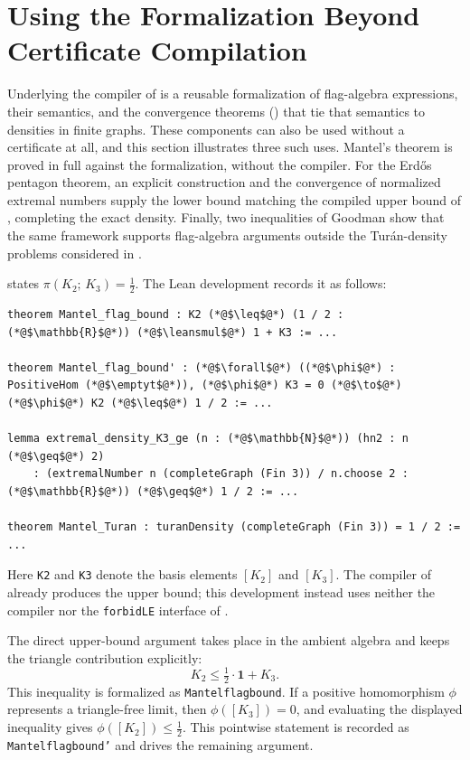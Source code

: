 \documentclass[acmsmall,screen=true,acmthm=false]{acmart}
\newcommand{\tdensity}[2]{\pi(#1;\,#2)}
\newcommand{\boldparagraph}[1]{\noindentparagraph{\textnormal{\textbf{#1}}}}
\DeclareRobustCommand{\lean}[1]{{\def\_{\textunderscore\allowbreak}\texttt{#1}}}
\newcommand{\emptyt}{\emptyset_{\mathrm{t}}}
\newcommand{\leansmul}{\mathbin{\vcenter{\hbox{$\scriptstyle\bullet$}}}}
\begin{document}
\section{Using the Formalization Beyond Certificate Compilation}
\label{sec:lowerbounds}

Underlying the compiler of  is a reusable formalization of
flag-algebra expressions, their semantics, and the convergence theorems
() that tie that semantics to densities in finite
graphs.  These components can also be
used without a certificate at all, and this section illustrates three such
uses.  Mantel's theorem is proved in full against the formalization, without
the compiler.  For the Erd\H{o}s pentagon theorem, an explicit construction
and the convergence of normalized extremal numbers supply the lower bound
matching the compiled upper bound of , completing the exact
density.  Finally, two inequalities of
Goodman show that the same framework supports flag-algebra arguments outside
the Tur\'an-density problems considered in .

\boldparagraph{Mantel's theorem.}
 states $\tdensity{K_2}{K_3}=\tfrac12$.  The Lean development
records it as follows:
\begin{lstlisting}
theorem Mantel_flag_bound : K2 (*@$\leq$@*) (1 / 2 : (*@$\mathbb{R}$@*)) (*@$\leansmul$@*) 1 + K3 := ...

theorem Mantel_flag_bound' : (*@$\forall$@*) ((*@$\phi$@*) : PositiveHom (*@$\emptyt$@*)), (*@$\phi$@*) K3 = 0 (*@$\to$@*) (*@$\phi$@*) K2 (*@$\leq$@*) 1 / 2 := ...

lemma extremal_density_K3_ge (n : (*@$\mathbb{N}$@*)) (hn2 : n (*@$\geq$@*) 2)
    : (extremalNumber n (completeGraph (Fin 3)) / n.choose 2 : (*@$\mathbb{R}$@*)) (*@$\geq$@*) 1 / 2 := ...

theorem Mantel_Turan : turanDensity (completeGraph (Fin 3)) = 1 / 2 := ...
\end{lstlisting}
Here \lean{K2} and \lean{K3} denote the basis elements $[K_2]$ and $[K_3]$.
The compiler of  already produces the upper bound; this
development instead uses neither the compiler nor the
\lean{forbidLE} interface of .

The direct upper-bound argument takes place in the ambient algebra and keeps
the triangle contribution explicitly:
\[
  K_2\leq\tfrac12\cdot\mathbf{1}+K_3.
\]
This inequality is formalized as \lean{Mantel\_flag\_bound}.  If a positive
homomorphism $\phi$ represents a triangle-free limit, then
$\phi([K_3])=0$, and evaluating the displayed inequality gives
$\phi([K_2])\leq\tfrac12$.  This pointwise statement is recorded as
\lean{Mantel\_flag\_bound'} and drives the remaining argument.
\end{document}

